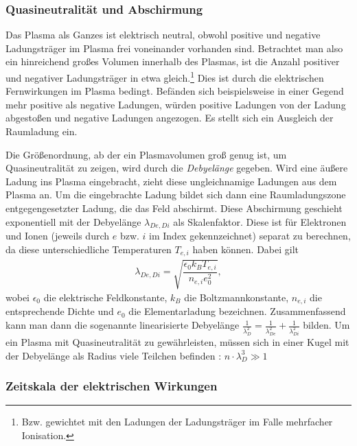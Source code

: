 \subsubsection{Quasineutralität und Abschirmung}

Das Plasma als Ganzes ist elektrisch neutral, obwohl positive und negative Ladungsträger im Plasma frei voneinander vorhanden sind. Betrachtet man also ein hinreichend großes Volumen innerhalb des Plasmas, ist die Anzahl positiver und negativer Ladungsträger in etwa gleich.\footnote{Bzw. gewichtet mit den Ladungen der Ladungsträger im Falle mehrfacher Ionisation.} Dies ist durch die elektrischen Fernwirkungen im Plasma bedingt. Befänden sich beispielsweise in einer Gegend mehr positive als negative Ladungen, würden positive Ladungen von der Ladung abgestoßen und negative Ladungen angezogen. Es stellt sich ein Ausgleich der Raumladung ein.

Die Größenordnung, ab der ein Plasmavolumen groß genug ist, um Quasineutralität zu zeigen, wird durch die \textit{Debyelänge} gegeben. Wird eine äußere Ladung ins Plasma eingebracht, zieht diese ungleichnamige Ladungen aus dem Plasma an. Um die eingebrachte Ladung bildet sich dann eine Raumladungszone entgegengesetzter Ladung, die das Feld abschirmt. Diese Abschirmung geschieht exponentiell mit der Debyelänge $\lambda_{De,Di}$ als Skalenfaktor. Diese ist für Elektronen und Ionen (jeweils durch $ e $ bzw. $ i $ im Index gekennzeichnet) separat zu berechnen, da diese unterschiedliche Temperaturen $ T_{e,i} $ haben können. Dabei gilt \cite{pielPlasmaPhysicsIntroduction2010}
\begin{align*}
	\lambda_{De,Di}  = \sqrt{\dfrac{\epsilon_0k_BT_{e,i}}{n_{e,i}e_0^2}},
\end{align*}
wobei $ \epsilon_0 $ die elektrische Feldkonstante, $ k_B $ die Boltzmannkonstante, $ n_{e,i} $ die entsprechende Dichte und $ e_0 $ die Elementarladung bezeichnen.
Zusammenfassend kann man dann die sogenannte linearisierte Debyelänge $ \frac{1}{\lambda_D^2} = \frac{1}{\lambda_{De}^2} + \frac{1}{\lambda_{Di}^2} $ bilden. Um ein Plasma mit Quasineutralität zu gewährleisten, müssen sich in einer Kugel mit der Debyelänge als Radius viele Teilchen befinden \cite{pielPlasmaPhysicsIntroduction2010}: $ n\cdot\lambda_{D}^{3}\gg 1 $

\subsubsection{Zeitskala der elektrischen Wirkungen}

